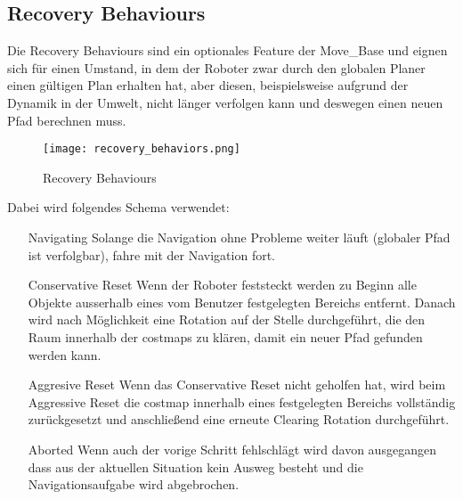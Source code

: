 \documentclass[oribibl]{llncs}
\begin{document}
\subsection{Recovery Behaviours} \label{recoveryBehaviours}
Die Recovery Behaviours sind ein optionales Feature der Move\_Base und eignen sich für einen Umstand, in dem der Roboter zwar durch den globalen Planer einen gültigen Plan erhalten hat, aber diesen, beispielsweise aufgrund der Dynamik in der Umwelt, nicht länger verfolgen kann und deswegen einen neuen Pfad berechnen muss.\\
\begin{figure}
	\centering
  \texttt{[image: recovery\_behaviors.png]}
	\caption{Recovery Behaviours}
	\cite{recoveryBehavioursImage}
\end{figure}

Dabei wird folgendes Schema verwendet:\cite{recoveryBehaviours}
\begin{enumerate}
\item [Navigating] Solange die Navigation ohne Probleme weiter läuft (globaler Pfad ist verfolgbar), fahre mit der Navigation fort.
\item [Conservative Reset] Wenn der Roboter feststeckt werden zu Beginn alle Objekte ausserhalb eines vom Benutzer festgelegten Bereichs entfernt. Danach wird nach Möglichkeit eine Rotation auf der Stelle durchgeführt, die den Raum innerhalb der costmaps zu klären, damit ein neuer Pfad gefunden werden kann.
\item [Aggresive Reset] Wenn das Conservative Reset nicht geholfen hat, wird beim Aggressive Reset die costmap innerhalb eines festgelegten Bereichs vollständig zurückgesetzt und anschließend eine erneute Clearing Rotation durchgeführt.
\item [Aborted] Wenn auch der vorige Schritt fehlschlägt wird davon ausgegangen dass aus der aktuellen Situation kein Ausweg besteht und die Navigationsaufgabe wird abgebrochen.
\end{enumerate}
\end{document}
